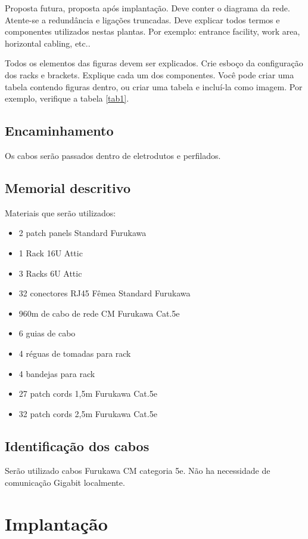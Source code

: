 \documentclass[	DIV=calc,%
							paper=a4,%
							fontsize=12pt,%
							onecolumn]{scrartcl}	 					%
\begin{document}
Proposta futura, proposta após implantação.
Deve conter o diagrama da rede. Atente-se a redundância  e ligações truncadas.
Deve explicar todos termos e componentes utilizados nestas plantas. Por exemplo: entrance facility, work area, horizontal cabling, etc..

Todos os elementos das figuras devem ser explicados. 
Crie esboço da configuração dos racks e brackets. Explique cada um dos componentes. Você pode criar uma tabela contendo figuras dentro, ou criar uma tabela e incluí-la como imagem. Por exemplo, verifique a tabela \ref{tab1}.


\subsection{Encaminhamento}
Os cabos serão passados dentro de eletrodutos e perfilados. 

\subsection{Memorial descritivo}
Materiais que serão utilizados:
\begin{itemize}
	\item 2 patch panels Standard Furukawa
	\item 1 Rack 16U Attic
	\item 3 Racks 6U Attic
	\item 32 conectores RJ45 Fêmea Standard Furukawa
	\item 960m de cabo de rede CM Furukawa Cat.5e
	\item 6 guias de cabo
	\item 4 réguas de tomadas para rack
	\item 4 bandejas para rack
	\item 27 patch cords 1,5m Furukawa Cat.5e
	\item 32 patch cords 2,5m Furukawa Cat.5e
\end{itemize}

\subsection{Identificação dos cabos}
Serão utilizado cabos Furukawa CM categoria 5e. Não ha necessidade de comunicação Gigabit localmente.

\section{Implantação}
\end{document}
